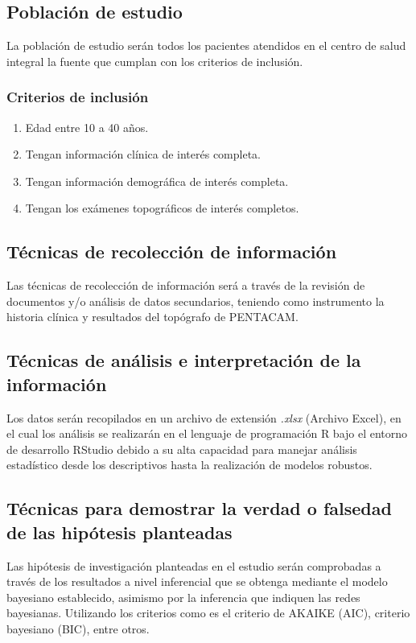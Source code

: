 \subsection{Población de estudio}
La población de estudio serán todos los pacientes atendidos en el centro de salud integral la fuente que cumplan con los criterios de inclusión.

\subsubsection{Criterios de inclusión}
\begin{enumerate}
    \item Edad entre 10 a 40 años.
    \item Tengan información clínica de interés completa.
    \item Tengan información demográfica de interés completa.
    \item Tengan los exámenes topográficos de interés completos. 
\end{enumerate}


\subsection{Técnicas de recolección de información}
Las técnicas de recolección de información será a través de la revisión de documentos y/o análisis de datos secundarios, teniendo como instrumento la historia clínica y resultados del topógrafo de PENTACAM.

\subsection{Técnicas de análisis e interpretación de la información}
Los datos serán recopilados en un archivo de extensión \textsl{.xlsx} (Archivo Excel), en el cual los análisis se realizarán en el lenguaje de programación R bajo el entorno de desarrollo RStudio debido a su alta capacidad para manejar análisis estadístico desde los descriptivos hasta la realización de modelos robustos.

\subsection{Técnicas para demostrar la verdad o falsedad de las hipótesis planteadas}
Las hipótesis de investigación planteadas en el estudio serán comprobadas a través de los resultados a nivel inferencial que se obtenga mediante el modelo bayesiano establecido, asimismo por la inferencia que indiquen las redes bayesianas. Utilizando los criterios como es el criterio de AKAIKE (AIC), criterio bayesiano (BIC), entre otros.

